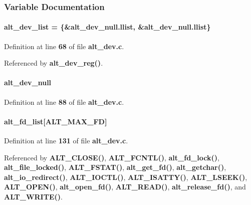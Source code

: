 \subsubsection{Variable Documentation}
\paragraph[{alt\+\_\+dev\+\_\+list}]{ alt\+\_\+dev\+\_\+list = \{\&alt\+\_\+dev\+\_\+null.\+llist, \&alt\+\_\+dev\+\_\+null.\+llist\}}\label{alt__dev_8c_a39bed231770a966001ae9f4cd2ce4074}


Definition at line {\bf 68} of file {\bf alt\+\_\+dev.\+c}.



Referenced by {\bf alt\+\_\+dev\+\_\+reg()}.

\paragraph[{alt\+\_\+dev\+\_\+null}]{ alt\+\_\+dev\+\_\+null}\label{alt__dev_8c_a35be47dda8206d4e94aa85420613ceff}


Definition at line {\bf 88} of file {\bf alt\+\_\+dev.\+c}.

\paragraph[{alt\+\_\+fd\+\_\+list}]{ alt\+\_\+fd\+\_\+list[{\bf A\+L\+T\+\_\+\+M\+A\+X\+\_\+\+FD}]}\label{alt__dev_8c_a784bb8a67810d153ce64e31703d1dfe6}


Definition at line {\bf 131} of file {\bf alt\+\_\+dev.\+c}.



Referenced by {\bf A\+L\+T\+\_\+\+C\+L\+O\+S\+E()}, {\bf A\+L\+T\+\_\+\+F\+C\+N\+T\+L()}, {\bf alt\+\_\+fd\+\_\+lock()}, {\bf alt\+\_\+file\+\_\+locked()}, {\bf A\+L\+T\+\_\+\+F\+S\+T\+A\+T()}, {\bf alt\+\_\+get\+\_\+fd()}, {\bf alt\+\_\+getchar()}, {\bf alt\+\_\+io\+\_\+redirect()}, {\bf A\+L\+T\+\_\+\+I\+O\+C\+T\+L()}, {\bf A\+L\+T\+\_\+\+I\+S\+A\+T\+T\+Y()}, {\bf A\+L\+T\+\_\+\+L\+S\+E\+E\+K()}, {\bf A\+L\+T\+\_\+\+O\+P\+E\+N()}, {\bf alt\+\_\+open\+\_\+fd()}, {\bf A\+L\+T\+\_\+\+R\+E\+A\+D()}, {\bf alt\+\_\+release\+\_\+fd()}, and {\bf A\+L\+T\+\_\+\+W\+R\+I\+T\+E()}.

